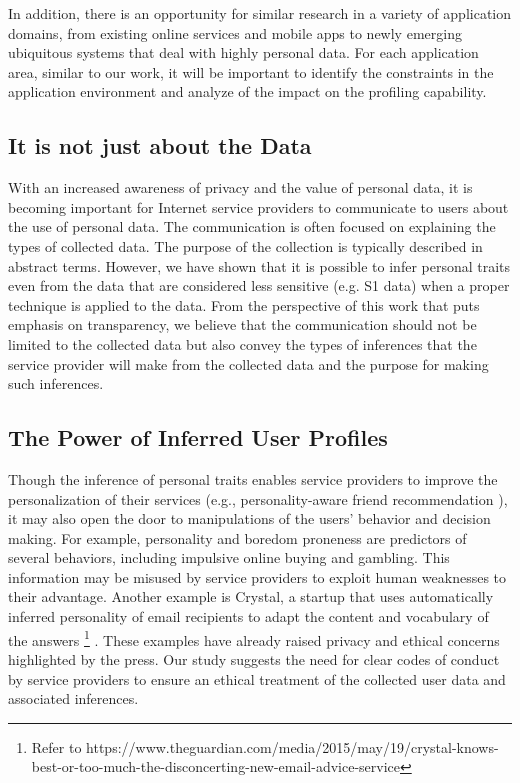 In addition, there is an opportunity for similar research in a variety of application domains, from existing online services and mobile apps to newly emerging ubiquitous systems that deal with highly personal data. For each application area, similar to our work, it will be important to identify the constraints in the application environment and analyze of the impact on the profiling capability. 

\subsection{It is not just about the Data}
With an increased awareness of privacy and the value of personal data, it is becoming important for Internet service providers to communicate to users about the use of personal data. The communication is often focused on explaining the types of collected data. The purpose of the collection is typically described in abstract terms. However, we have shown that it is possible to infer personal traits even from the data that are considered less sensitive (e.g. S1 data) when a proper technique is applied to the data. From the perspective of this work that puts emphasis on transparency, we believe that the communication should not be limited to the collected data but also convey the types of inferences that the service provider will make from the collected data and the purpose for making such inferences.

\subsection{The Power of Inferred User Profiles}
Though the inference of personal traits enables service providers to improve the personalization of their services (e.g., personality-aware friend recommendation \cite{bian2011online}), it may also open the door to manipulations of the users' behavior and decision making. For example, personality and boredom proneness are predictors of several behaviors, including impulsive online buying and gambling. This information may be misused by service providers to exploit human weaknesses to their advantage. Another example is Crystal, a startup that uses automatically inferred personality of email recipients to adapt the content and vocabulary of the answers
\footnote{Refer to https://www.theguardian.com/media/2015/may/19/crystal-knows-best-or-too-much-the-disconcerting-new-email-advice-service}
. These examples have already raised privacy and ethical concerns highlighted by the press. Our study suggests the need for clear codes of conduct by service providers to ensure an ethical treatment of the collected user data and associated inferences.

